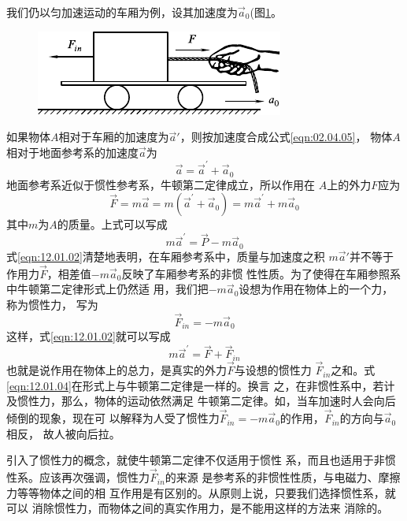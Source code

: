 我们仍以匀加速运动的车厢为例，设其加速度为$ \vec{a} _ { 0 } $(图\ref{fig:12.01}。
\begin{figure}[h]
  \centering
  \includegraphics{figure/fig12.01}
  \caption{}
  \label{fig:12.01}
\end{figure}
如果物体$ A $相对于车厢的加速度为$ \vec{a}' $，则按加速度合成公式\eqref{eqn:02.04.05}，
物体$ A $相对于地面参考系的加速度$ \vec{a} $为
\begin{equation}\label{eqn:12.01.01}
  \vec{a} = \vec{a} ^ { \prime } + \vec{a} _ { 0 }
\end{equation}
地面参考系近似于惯性参考系，牛顿第二定律成立，所以作用在
$ A $上的外力$ F $应为
\begin{equation*}
  \vec{F} = m \vec{a} = m \left( \vec{a} ^ { \prime } + \vec{a} _ { 0 } \right) = m \vec{a} ^ { \prime } + m \vec{a} _ { 0 }
\end{equation*}
其中$ m $为$ A $的质量。上式可以写成
\begin{equation}\label{eqn:12.01.02}
  m \vec{a} ^ { \prime } = \vec{P} - m \vec{a} _ { 0 }
\end{equation}
式\eqref{eqn:12.01.02}清楚地表明，在车厢参考系中，质量与加速度之积
$ m \vec{a} ' $并不等于作用力$\vec{F}$，相差值$ - m \vec{a} _ 0 $反映了车厢参考系的非惯
性性质。为了使得在车厢参照系中牛顿第二定律形式上仍然适
用，我们把$-m\vec{a}_0$设想为作用在物体上的一个力，称为惯性力，
写为
\begin{equation}\label{eqn:12.01.03}
  \vec{F} _ { in } = - m \vec{a} _ { 0 }
\end{equation}
这样，式\eqref{eqn:12.01.02}就可以写成
\begin{equation}\label{eqn:12.01.04}
  m \vec{a} ^ { \prime } = \vec{F} + \vec{F} _ {in}
\end{equation}
也就是说作用在物体上的总力，是真实的外力$\vec{F}$与设想的惯性力
$\vec{F}_{in}$之和。式\eqref{eqn:12.01.04}在形式上与牛顿第二定律是一样的。换言
之，在非惯性系中，若计及惯性力，那么，物体的运动依然满足
牛顿第二定律。如，当车加速时人会向后倾倒的现象，现在可
以解释为人受了惯性力$ \vec{F}_{in}=-m\vec{a}_0 $的作用，$\vec{F}_{in}$的方向与$\vec{a}_0$相反，
故人被向后拉。

引入了惯性力的概念，就使牛顿第二定律不仅适用于惯性
系，而且也适用于非惯性系。应该再次强调，惯性力$ \vec{F}_{in} $的来源
是参考系的非惯性性质，与电磁力、摩擦力等等物体之间的相
互作用是有区别的。从原则上说，只要我们选择惯性系，就可以
消除惯性力，而物体之间的真实作用力，是不能用这样的方法来
消除的。

